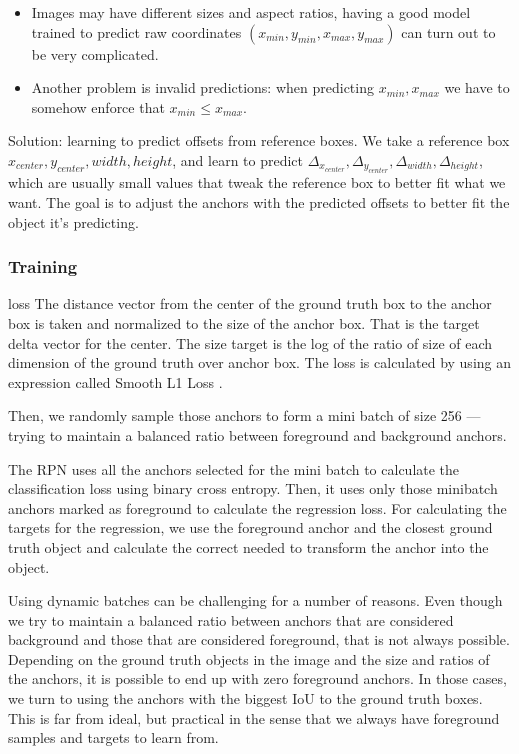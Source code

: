 \documentclass{article}
\begin{document}
\begin{itemize}
    \item Images may have different sizes and aspect ratios, having a good model trained to predict raw coordinates $(x_{min},y_{min},x_{max},y_{max})$ can turn out to be very complicated.
    \item Another problem is invalid predictions: when predicting $x_{min},x_{max}$ we have to somehow enforce that $x_{min} \leq x_{max}$.
\end{itemize}

Solution: learning to predict offsets from reference boxes. 
We take a reference box $x_{center},y_{center},width,height$, and learn to predict $\Delta_{x_{center}},\Delta_{y_{center}},\Delta_{width},\Delta_{height}$, which are usually small values that tweak the reference box to better fit what we want.
The goal is to adjust the anchors with the predicted offsets to better fit the object it’s predicting.

\subsubsection{Training}

loss 
The distance vector from the center of the ground truth box to the anchor box is taken and normalized to the size of the anchor box. 
That is the target delta vector for the center. 
The size target is the log of the ratio of size of each dimension of the ground truth over anchor box. 
The loss is calculated by using an expression called Smooth L1 Loss .

Then, we randomly sample those anchors to form a mini batch of size 256 — trying to maintain a balanced ratio between foreground and background anchors.

The RPN uses all the anchors selected for the mini batch to calculate the classification loss using binary cross entropy. Then, it uses only those minibatch anchors marked as foreground to calculate the regression loss. For calculating the targets for the regression, we use the foreground anchor and the closest ground truth object and calculate the correct  needed to transform the anchor into the object.

Using dynamic batches can be challenging for a number of reasons. Even though we try to maintain a balanced ratio between anchors that are considered background and those that are considered foreground, that is not always possible. Depending on the ground truth objects in the image and the size and ratios of the anchors, it is possible to end up with zero foreground anchors. In those cases, we turn to using the anchors with the biggest IoU to the ground truth boxes. This is far from ideal, but practical in the sense that we always have foreground samples and targets to learn from.
\end{document}
